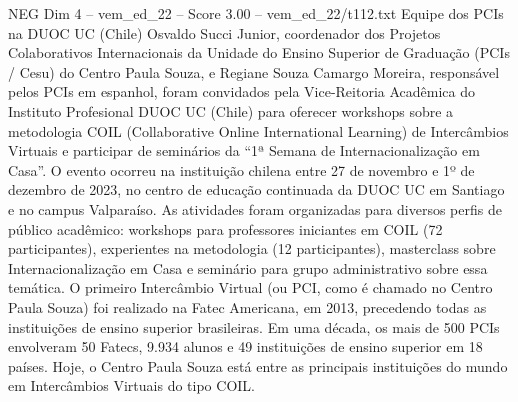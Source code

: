 \begin{textsample}{NEG Dim 4 – vem\_ed\_22 – Score 3.00 – vem\_ed\_22/t112.txt}  \label{ex:f4_neg_019}
Equipe dos PCIs na DUOC UC (Chile) Osvaldo Succi Junior, coordenador dos Projetos Colaborativos Internacionais da Unidade do Ensino Superior de Graduação (PCIs / Cesu) do Centro Paula Souza, e Regiane Souza Camargo Moreira, responsável pelos PCIs em espanhol, foram convidados pela Vice-Reitoria Acadêmica do Instituto Profesional DUOC UC (Chile) para oferecer workshops sobre a metodologia COIL (Collaborative Online International Learning) de Intercâmbios Virtuais e participar de seminários da “1ª Semana de Internacionalização em Casa”.
O evento ocorreu na instituição chilena entre 27 de novembro e 1º de dezembro de 2023, no centro de educação continuada da DUOC UC em Santiago e no campus Valparaíso.
As atividades foram organizadas para diversos perfis de público acadêmico: workshops para professores iniciantes em COIL (72 participantes), experientes na metodologia (12 participantes), masterclass sobre Internacionalização em Casa e seminário para grupo administrativo sobre essa temática.
O primeiro Intercâmbio Virtual (ou PCI, como é chamado no Centro Paula Souza) foi realizado na Fatec Americana, em 2013, precedendo todas as instituições de ensino superior brasileiras.
Em uma década, os mais de 500 PCIs envolveram 50 Fatecs, 9.934 alunos e 49 instituições de ensino superior em 18 países.
Hoje, o Centro Paula Souza está entre as principais instituições do mundo em Intercâmbios Virtuais do tipo COIL.

\end{textsample}
